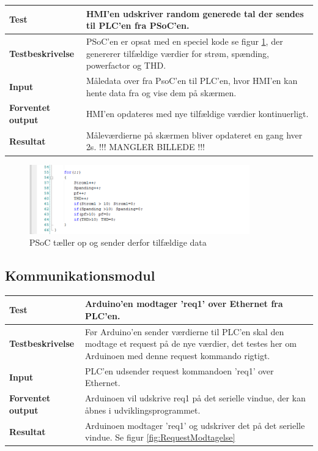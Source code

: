 \begin{center}
	\begin{tabular}{ | m{} | m{}|} 
		\hline
		\textbf{Test}					&HMI'en udskriver random generede tal der sendes til PLC'en fra PSoC'en. \\ \hline
		\textbf{Testbeskrivelse}		&PSoC'en er opsat med en speciel kode se figur \ref{fig:PSoCkodeeksempel}, der genererer tilfældige værdier for strøm, spænding, powerfactor og THD.  \\ \hline
		\textbf{Input}					& Måledata over fra PsoC'en til PLC'en, hvor HMI'en kan hente data fra og vise dem på skærmen.\\ \hline
		\textbf{Forventet output}		&HMI'en opdateres med nye tilfældige værdier kontinuerligt.\\ \hline
		\textbf{Resultat}				&Måleværdierne på skærmen bliver opdateret en gang hver 2s.  !!! MANGLER BILLEDE !!!\\ \hline
	\end{tabular}
\end{center}

\begin{figure}[H] %
	\centering
	\includegraphics[width=0.85\textwidth]{Test/ModultestStyringsenhed/PSoCkodeeksempel}
	\caption{PSoC tæller op og sender derfor tilfældige data}
	\label{fig:PSoCkodeeksempel}
\end{figure}


\subsection{Kommunikationsmodul}

\begin{center}
	\begin{tabular}{ | m{} | m{}|} 
		\hline
		\textbf{Test}					&Arduino'en modtager 'req1' over Ethernet fra PLC'en.  \\ \hline
		\textbf{Testbeskrivelse}		&Før Arduino'en sender værdierne til PLC'en skal den modtage et request på de nye værdier, det testes her om Arduinoen med denne request kommando rigtigt.  \\ \hline
		\textbf{Input}					& PLC'en udsender request kommandoen 'req1' over Ethernet.\\ \hline
		\textbf{Forventet output}		&Arduinoen vil udskrive req1 på det serielle vindue, der kan åbnes i udviklingsprogrammet. \\ \hline
		\textbf{Resultat}				&Arduinoen modtager 'req1' og udskriver det på det serielle vindue. Se figur  \ref{fig:RequestModtagelse} \\ \hline
	\end{tabular}
\end{center}

